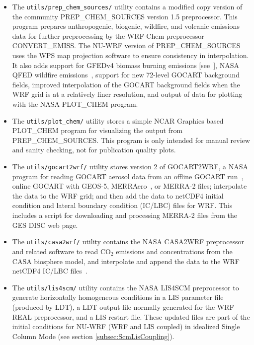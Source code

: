 \begin{itemize}
\item The \texttt{utils/prep\_chem\_sources/} utility contains a modified
  copy version of the community PREP\_CHEM\_SOURCES version 1.5 
  preprocessor. This program prepares anthropogenic, biogenic, wildfire, and 
  volcanic emissions data for further preprocessing by the WRF-Chem 
  preprocessor CONVERT\_EMISS.  The NU-WRF version of PREP\_CHEM\_SOURCES
  uses the WPS map projection software to ensure consistency in interpolation.
  It also adds support for GFEDv4 biomass burning emissions [see~\citep{ref:RandersonEtAl2015}], 
  NASA QFED wildfire emissions~\citep{ref:QfedDocumentation}, support for new 72-level 
  GOCART background fields, improved interpolation of the GOCART background 
  fields when the WRF grid is at a relatively finer resolution, and output of 
  data for plotting with the NASA PLOT\_CHEM program.

\item The \texttt{utils/plot\_chem/} utility stores a simple NCAR Graphics
  based PLOT\_CHEM program for visualizing the output from PREP\_CHEM\_SOURCES.
  This program is only intended for manual review and sanity checking, not
  for publication quality plots.

\item The \texttt{utils/gocart2wrf/} utility stores version 2 of 
  GOCART2WRF, a NASA program for reading GOCART aerosol data from an offline
  GOCART run~\citep{ref:ChinEtAl2002}, online GOCART with GEOS-5, 
  MERRAero~\citep{ref:KishchaEtAl2014}, or MERRA-2
  \citep{ref:BosilovichEtAl2015} files; interpolate the data to the WRF grid; 
  and then add the data to netCDF4 initial condition and lateral boundary 
  condition (IC/LBC) files for WRF. This includes a script for downloading and
  processing MERRA-2 files from the GES DISC web page.

\item The \texttt{utils/casa2wrf/} utility contains the NASA CASA2WRF 
  preprocessor and related software to read CO$_2$ emissions and 
  concentrations from the CASA biosphere model, and interpolate and append 
  the data to the WRF netCDF4 IC/LBC files~\citep{ref:Casa2WrfUserGuide}.

\item The \texttt{utils/lis4scm/} utility contains the NASA LIS4SCM
  preprocessor to generate horizontally homogeneous conditions in a LIS 
  parameter file (produced by LDT), a LDT output file normally generated for 
  the WRF REAL preprocessor, and a LIS restart file.  These updated files are 
  part of the initial conditions for NU-WRF (WRF and LIS coupled) in idealized 
  Single Column Mode (see section \ref{subsec:ScmLisCoupling}).


\end{itemize}
